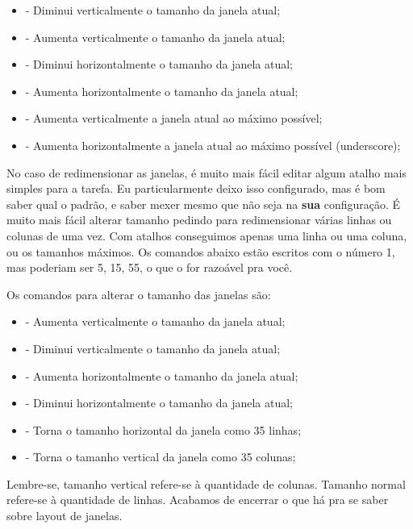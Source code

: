 \begin{itemize}
    \item {} - Diminui verticalmente o tamanho da janela atual;
    \item {} - Aumenta verticalmente o tamanho da janela atual;
    \item {} - Diminui horizontalmente o tamanho da janela atual;
    \item {} - Aumenta horizontalmente o tamanho da janela atual;
    \item {} - Aumenta verticalmente a janela atual ao máximo possível;
    \item {} - Aumenta horizontalmente a janela atual ao máximo possível (underscore);
\end{itemize}

No caso de redimensionar as janelas, é muito mais fácil editar algum atalho mais simples para a tarefa.
Eu particularmente deixo isso configurado, mas é bom saber qual o padrão, e saber mexer mesmo que não
seja na \textbf{sua} configuração.
É muito mais fácil alterar tamanho pedindo para redimensionar várias linhas ou colunas de uma vez.
Com atalhos conseguimos apenas uma linha ou uma coluna, ou os tamanhos máximos.
Os comandos abaixo estão escritos com o número 1, mas poderiam ser 5, 15, 55, o que o for razoável pra você.

Os comandos para alterar o tamanho das janelas são:
\begin{itemize}
    \item {} - Aumenta verticalmente o tamanho da janela atual;
    \item {} - Diminui verticalmente o tamanho da janela atual;
    \item {} - Aumenta horizontalmente o tamanho da janela atual;
    \item {} - Diminui horizontalmente o tamanho da janela atual;
    \item {} - Torna o tamanho horizontal da janela como 35 linhas;
    \item {} - Torna o tamanho vertical da janela como 35 colunas;
\end{itemize}

Lembre-se, tamanho vertical refere-se à quantidade de colunas. Tamanho normal refere-se à quantidade de linhas.
Acabamos de encerrar o que há pra se saber sobre layout de janelas.

